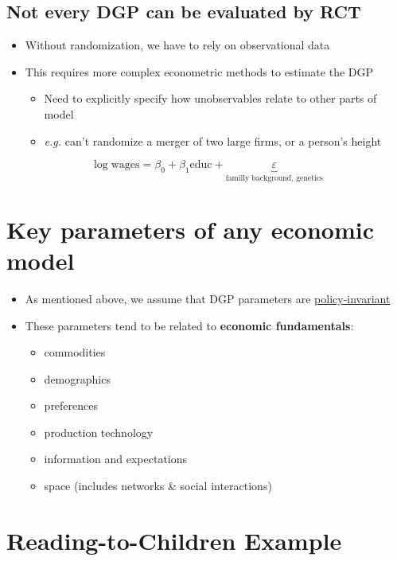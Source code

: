 \documentclass[11pt]{article}
\begin{document}
\subsection{Not every DGP can be evaluated by RCT}
\label{sec:org922c5c3}

\begin{itemize}
\item Without randomization, we have to rely on observational data
\item This requires more complex econometric methods to estimate the DGP
\begin{itemize}
\item Need to explicitly specify how unobservables relate to other parts of model
\item \emph{e.g.} can't randomize a merger of two large firms, or a person's height
\end{itemize}
\end{itemize}

$$
\log \text{wages} = \beta_0 + \beta_1 \text{educ} + \underbrace{\varepsilon}_{\text{familly background, genetics}}
$$

\section{Key parameters of any economic model}
\label{sec:org6a7e751}

\begin{itemize}
\item As mentioned above, we assume that DGP parameters are \uline{policy-invariant}
\item These parameters tend to be related to \textbf{economic fundamentals}:

\begin{itemize}
\item commodities
\item demographics
\item preferences
\item production technology
\item information and expectations
\item space (includes networks \& social interactions)
\end{itemize}
\end{itemize}

\section{Reading-to-Children Example}
\label{sec:org15db5f1}
\end{document}
